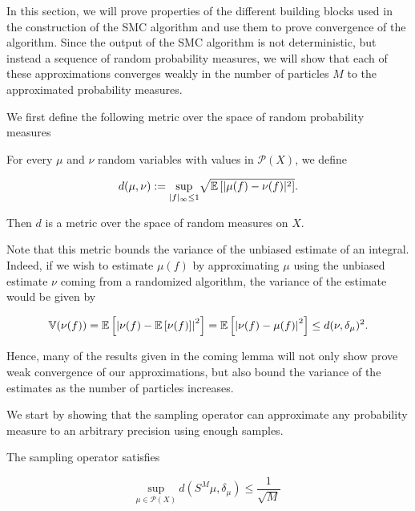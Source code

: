 In this section, we will prove properties of the different building blocks used in the construction of the SMC algorithm and use them to prove convergence of the algorithm. Since the output of the SMC algorithm is not deterministic, but instead a sequence of random probability measures, we will show that each of these approximations converges weakly in the number of particles $M$ to the approximated probability measures.

We first define the following metric over the space of random probability measures

\begin{definition}
  For every $\mu$ and $\nu$ random variables with values in $\mathcal{P}(X)$, we define

  \begin{equation*}
    d(\mu, \nu) := \underset{|f|_\infty\le1}{\text{sup}} \sqrt{\mathbb{E}\left[|\mu(f) - \nu(f)|^2\right]}.
  \end{equation*}

Then $d$ is a metric over the space of random measures on $X$.
\end{definition}

Note that this metric bounds the variance of the unbiased estimate of an integral. Indeed, if we wish to estimate $\mu(f)$ by approximating $\mu$ using the unbiased estimate $\nu$ coming from a randomized algorithm, the variance of the estimate would be given by

\begin{equation*}
  \mathbb{V}(\nu(f)) = \mathbb{E}\left[\left|\nu(f) - \mathbb{E}\left[\nu(f)\right]\right|^2\right] = \mathbb{E}\left[\left|\nu(f) - \mu(f)\right|^2\right] \le d(\nu, \delta_\mu)^2.
\end{equation*}

Hence, many of the results given in the coming lemma will not only show prove weak convergence of our approximations, but also bound the variance of the estimates as the number of particles increases.

We start by showing that the sampling operator can approximate any probability measure to an arbitrary precision using enough samples.

\begin{lemma}\label{sampling-bound}
  The sampling operator satisfies

  \begin{equation*}
    \underset{\mu \in \mathcal{P}(X)}{\text{sup}}\ d(S^M\mu, \delta_\mu) \le \frac1{\sqrt{M}}
  \end{equation*}
\end{lemma}

